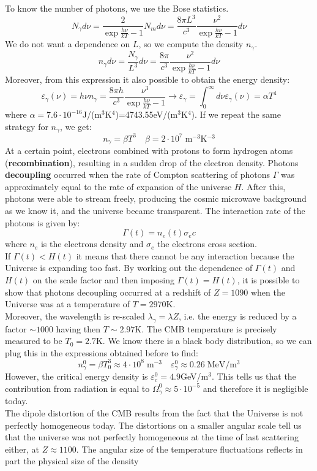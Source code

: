 \documentclass[10.75pt,a4paper,openright,bottom=2cm]{article}
\begin{document}
To know the number of photons, we use the Bose statistics.
\[
N_\gamma d\nu=\frac{2}{\exp{\frac{h\nu}{kT}}-1}N_md\nu=\frac{8\pi L^3}{c^3}\frac{\nu^2}{\exp{\frac{h\nu}{kT}}-1}d\nu
\]
We do not want a dependence on $L$, so we compute the density $n_\gamma$.
\[
n_\gamma d\nu=\frac{N_\gamma}{L^3}d\nu=\frac{8\pi}{c^3}\frac{\nu^2}{\exp{\frac{h\nu}{kT}}-1}d\nu
\]
Moreover, from this expression it also possible to obtain the energy density:
\[
\varepsilon_\gamma(\nu)=h\nu n_\gamma=\frac{8\pi h}{c^3}\frac{\nu^3}{\exp{\frac{h\nu}{kT}}-1}\to\varepsilon_\gamma=\int_0^\infty d\nu\varepsilon_\gamma(\nu)=\alpha T^4
\]
where $\alpha=7.6\cdot10^{-16}$\;J/(m$^3$K$^4$)=4743.55\;eV/(m$^3$K$^4$). If we repeat the same strategy for $n_\gamma$, we get:
\[
n_\gamma=\beta T^3 \quad \beta=2\cdot10^7\;\text{m$^{-3}$K$^{-3}$}
\]
At a certain point, electrons combined with protons to form hydrogen atoms (\textbf{recombination}), resulting in a sudden drop of the electron density. Photons \textbf{decoupling} occurred when the rate of Compton scattering of photons $\Gamma$ was approximately equal to the rate of expansion of the universe $H$. After this, photons were able to stream freely, producing the cosmic microwave background as we know it, and the universe became transparent. The interaction rate of the photons is given by:
\[
\Gamma(t)=n_e(t)\sigma_ec
\]
where $n_e$ is the electrons density and $\sigma_e$ the electrons cross section.\\
If $\Gamma(t)<H(t)$ it means that there cannot be any interaction because the Universe is expanding too fast. By working out the dependence of $\Gamma(t)$ and $H(t)$ on the scale factor and then imposing $\Gamma(t)=H(t)$, it is possible to show that photons decoupling occurred at a redshift of $Z=1090$ when the Universe was at a temperature of $T=2970$\;K.\\
Moreover, the wavelength is re-scaled $\lambda_\gamma=\lambda Z$, i.e. the energy is reduced by a factor $\sim1000$ having then $T\sim2.97$\;K. The CMB temperature is precisely measured to be $T_0=2.7$\;K. We know there is a black body distribution, so we can plug this in the expressions obtained before to find:
\[
n_\gamma^0=\beta T_0^3\approx4\cdot10^8\;\text{m$^{-3}$} \quad \varepsilon_\gamma^0\approx0.26\;\text{MeV/m$^3$}
\]
However, the critical energy density is $\varepsilon_c^0=4.9$\;GeV/m$^3$. This tells us that the contribution from radiation is equal to $\Omega_\gamma^0\approx5\cdot10^{-5}$ and therefore it is negligible today.\\
The dipole distortion of the CMB results from the fact that the Universe is not perfectly homogeneous today. The distortions on a smaller angular scale tell us that the universe was not perfectly homogeneous at the time of last scattering either, at $Z\approx1100$. The angular size of the temperature fluctuations reflects in part the physical size of the density
\end{document}
